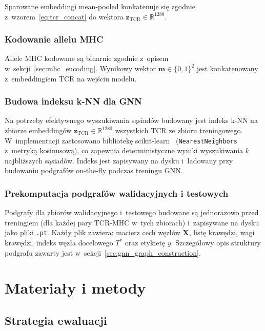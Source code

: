 \documentclass{SGGW-thesis}
\begin{document}
Sparowane embeddingi mean-pooled konkatenuje się zgodnie z~wzorem~\eqref{eq:tcr_concat} do wektora
$\mathbf{z}_{\mathrm{TCR}} \in \mathbb{R}^{1280}$.

\subsection{Kodowanie allelu MHC}

Allele MHC kodowane są binarnie zgodnie z~opisem w~sekcji~\ref{sec:mhc_encoding}. Wynikowy wektor
$\mathbf{m} \in \{0,1\}^2$ jest konkatenowany z~embeddingiem TCR na wejściu modelu.

\subsection{Budowa indeksu k-NN dla GNN}

Na potrzeby efektywnego wyszukiwania sąsiadów budowany jest indeks k-NN na zbiorze
embeddingów $\mathbf{z}_{\mathrm{TCR}} \in \mathbb{R}^{1280}$ wszystkich TCR ze zbioru
treningowego. W~implementacji zastosowano bibliotekę scikit-learn~\cite{pedregosa2011}
(\texttt{NearestNeighbors} z~metryką kosinusową), co zapewnia deterministyczne
wyniki wyszukiwania $k$ najbliższych sąsiadów. Indeks jest zapisywany na dysku i~ładowany
przy budowaniu podgrafów on-the-fly podczas treningu GNN.

\subsection{Prekomputacja podgrafów walidacyjnych i testowych}

Podgrafy dla zbiorów walidacyjnego i~testowego budowane są jednorazowo przed treningiem (dla każdej
pary TCR-MHC w~tych zbiorach) i~zapisywane na dysku jako pliki \texttt{.pt}. Każdy plik zawiera:
macierz cech węzłów $\mathbf{X}$, listę krawędzi, wagi krawędzi, indeks węzła docelowego $T^*$
oraz etykietę $y$. Szczegółowy opis struktury podgrafu zawarty jest w~sekcji~\ref{sec:gnn_graph_construction}.


\chapter{Materiały i metody}
\label{chap:metody}

\section{Strategia ewaluacji}
\label{sec:evaluation}
\end{document}
